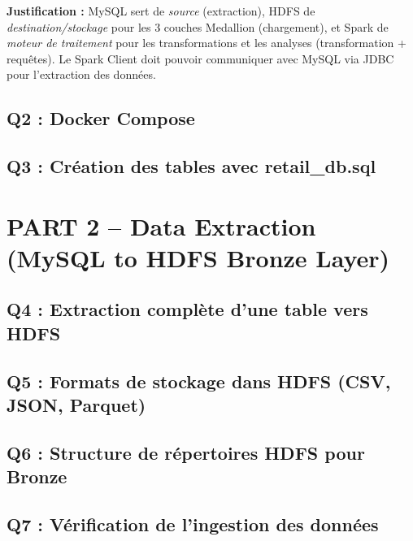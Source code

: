 \documentclass{RapportINPTCLOUD}
\begin{document}
\textbf{Justification :} MySQL sert de \textit{source} (extraction), HDFS de \textit{destination/stockage} pour les 3 couches Medallion (chargement), et Spark de \textit{moteur de traitement} pour les transformations et les analyses (transformation + requ\^{e}tes). Le Spark Client doit pouvoir communiquer avec MySQL via JDBC pour l'extraction des donn\'{e}es.

\subsection{Q2 : Docker Compose}


\subsection{Q3 : Cr\'{e}ation des tables avec retail\_db.sql}


\section{PART 2 -- Data Extraction (MySQL to HDFS Bronze Layer)}

\subsection{Q4 : Extraction compl\`{e}te d'une table vers HDFS}


\subsection{Q5 : Formats de stockage dans HDFS (CSV, JSON, Parquet)}


\subsection{Q6 : Structure de r\'{e}pertoires HDFS pour Bronze}


\subsection{Q7 : V\'{e}rification de l'ingestion des donn\'{e}es}
\end{document}
